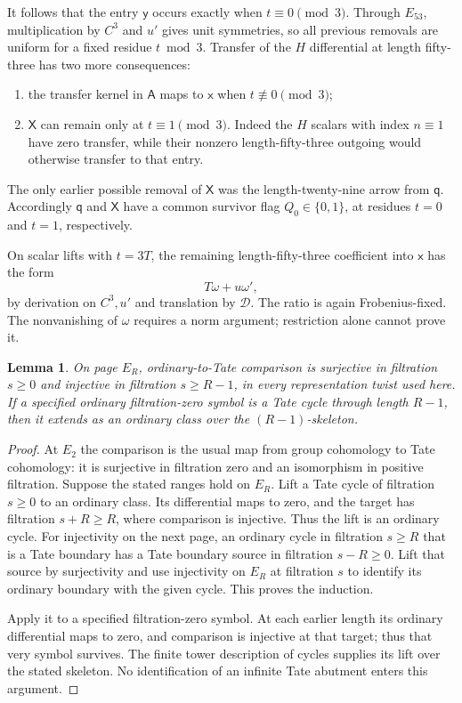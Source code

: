 \documentclass[11pt]{article}
\newtheorem{lemma}[theorem]{Lemma}
\theoremstyle{definition}
\theoremstyle{remark}
\numberwithin{equation}{section}
\begin{document}
It follows that the entry $\mathsf y$ occurs exactly when
$t\equiv0\pmod3$.  Through $E_{53}$, multiplication by
$C^3$ and $u'$ gives unit symmetries, so all previous
removals are uniform for a fixed residue $t\bmod3$.
Transfer of the $H$ differential at length fifty-three
has two more consequences:
\begin{enumerate}
\item the transfer kernel in $\mathsf A$ maps to
$\mathsf x$ when $t\not\equiv0\pmod3$;
\item $\mathsf X$ can remain only at $t\equiv1\pmod3$.
Indeed the $H$ scalars with index $n\equiv1$ have
zero transfer, while their nonzero length-fifty-three
outgoing would otherwise transfer to that entry.
\end{enumerate}
The only earlier possible removal of $\mathsf X$ was
the length-twenty-nine arrow from $\mathsf q$.
Accordingly $\mathsf q$ and $\mathsf X$ have a
common survivor flag $Q_0\in\{0,1\}$, at residues
$t=0$ and $t=1$, respectively.

On scalar lifts with $t=3T$, the remaining length-fifty-three
coefficient into $\mathsf x$ has the form
\begin{equation}\label{g:omega-form}
 T\omega+u\omega',
\end{equation}
by derivation on $C^3,u'$ and translation by
$\mathcal D$.  The ratio is again Frobenius-fixed.
The nonvanishing of $\omega$ requires a norm argument;
restriction alone cannot prove it.

\begin{lemma}\label{g:finite-comparison}
On page $E_R$, ordinary-to-Tate comparison is surjective
in filtration $s\ge0$ and injective in filtration
$s\ge R-1$, in every representation twist used here.
If a specified ordinary filtration-zero symbol is a Tate
cycle through length $R-1$, then it extends as an
ordinary class over the $(R-1)$-skeleton.
\end{lemma}

\begin{proof}
At $E_2$ the comparison is the usual map from group
cohomology to Tate cohomology: it is surjective in
filtration zero and an isomorphism in positive
filtration.  Suppose the stated ranges hold on $E_R$.
Lift a Tate cycle of filtration $s\ge0$ to an ordinary
class.  Its differential maps to zero, and the target
has filtration $s+R\ge R$, where comparison is
injective.  Thus the lift is an ordinary cycle.
For injectivity on the next page, an ordinary cycle in
filtration $s\ge R$ that is a Tate boundary has a
Tate boundary source in filtration $s-R\ge0$.
Lift that source by surjectivity and use injectivity
on $E_R$ at filtration $s$ to identify its ordinary
boundary with the given cycle.  This proves the
induction.

Apply it to a specified filtration-zero symbol.  At
each earlier length its ordinary differential maps
to zero, and comparison is injective at that target;
thus that very symbol survives.  The finite tower
description of cycles supplies its lift over the
stated skeleton.  No identification of an infinite
Tate abutment enters this argument.
\end{proof}
\end{document}
